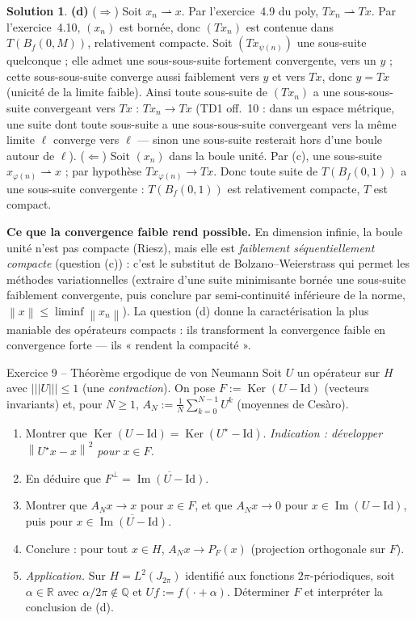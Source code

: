 \documentclass[11pt,a4paper]{article}
\newcommand{\R}{\mathbb{R}}
\newcommand{\Q}{\mathbb{Q}}
\newcommand{\adh}[1]{\overline{#1}}
\newcommand{\Bf}{B_f}
\newcommand{\norm}[1]{\left\|#1\right\|}
\newcommand{\opnorm}[1]{|\!|\!|#1|\!|\!|}
\DeclareMathOperator{\Ker}{Ker}
\DeclareMathOperator{\Ima}{Im}
\theoremstyle{definition}
\newtheorem*{solution}{Solution}
\begin{document}
\begin{solution}
\medskip
\noindent\textbf{(d)} ($\Rightarrow$) Soit $x_n\rightharpoonup x$. Par l'exercice~4.9 du poly, $Tx_n\rightharpoonup Tx$. Par l'exercice~4.10, $(x_n)$ est bornée, donc $(Tx_n)$ est contenue dans $T(\Bf(0,M))$, relativement compacte. Soit $(Tx_{\psi(n)})$ une sous-suite quelconque ; elle admet une sous-sous-suite fortement convergente, vers un $y$ ; cette sous-sous-suite converge aussi faiblement vers $y$ et vers $Tx$, donc $y=Tx$ (unicité de la limite faible). Ainsi toute sous-suite de $(Tx_n)$ a une sous-sous-suite convergeant vers $Tx$ : $Tx_n\to Tx$ (TD1 off.~10 : dans un espace métrique, une suite dont toute sous-suite a une sous-sous-suite convergeant vers la même limite $\ell$ converge vers $\ell$ — sinon une sous-suite resterait hors d'une boule autour de $\ell$). ($\Leftarrow$) Soit $(x_n)$ dans la boule unité. Par (c), une sous-suite $x_{\varphi(n)}\rightharpoonup x$ ; par hypothèse $Tx_{\varphi(n)}\to Tx$. Donc toute suite de $T(\Bf(0,1))$ a une sous-suite convergente : $T(\Bf(0,1))$ est relativement compacte, $T$ est compact.
\end{solution}

\begin{pointcle}
\textbf{Ce que la convergence faible rend possible.} En dimension infinie, la boule unité n'est pas compacte (Riesz), mais elle est \emph{faiblement séquentiellement compacte} (question (c)) : c'est le substitut de Bolzano--Weierstrass qui permet les méthodes variationnelles (extraire d'une suite minimisante bornée une sous-suite faiblement convergente, puis conclure par semi-continuité inférieure de la norme, $\norm x\le\liminf\norm{x_n}$). La question (d) donne la caractérisation la plus maniable des opérateurs compacts : ils transforment la convergence faible en convergence forte — ils « rendent la compacité ».
\end{pointcle}

\begin{exo}{Exercice 9 -- Théorème ergodique de von Neumann}
Soit $U$ un opérateur sur $H$ avec $\opnorm U\le1$ (une \emph{contraction}). On pose $F:=\Ker(U-\mathrm{Id})$ (vecteurs invariants) et, pour $N\ge1$, $A_N:=\frac1N\sum_{k=0}^{N-1}U^k$ (moyennes de Cesàro).
\begin{enumerate}[label=(\alph*)]
  \item Montrer que $\Ker(U-\mathrm{Id})=\Ker(U^\star-\mathrm{Id})$. \emph{Indication : développer $\norm{U^\star x-x}^2$ pour $x\in F$.}
  \item En déduire que $F^\perp=\adh{\Ima(U-\mathrm{Id})}$.
  \item Montrer que $A_Nx\to x$ pour $x\in F$, et que $A_Nx\to0$ pour $x\in\Ima(U-\mathrm{Id})$, puis pour $x\in\adh{\Ima(U-\mathrm{Id})}$.
  \item Conclure : pour tout $x\in H$, $A_Nx\to P_F(x)$ (projection orthogonale sur $F$).
  \item \emph{Application.} Sur $H=L^2(J_{2\pi})$ identifié aux fonctions $2\pi$-périodiques, soit $\alpha\in\R$ avec $\alpha/2\pi\notin\Q$ et $Uf:=f(\cdot+\alpha)$. Déterminer $F$ et interpréter la conclusion de (d).
\end{enumerate}
\end{exo}
\end{document}
